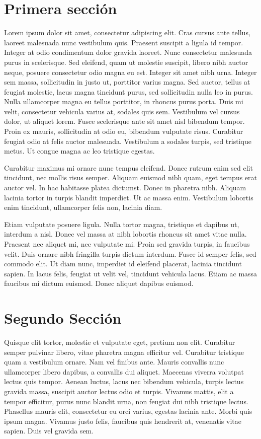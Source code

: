 \documentclass[a4paper,twoside=false,12pt,spanish,DIV=7]{scrbook}
\begin{document}
\section{Primera sección}
Lorem ipsum dolor sit amet, consectetur adipiscing elit. Cras cursus ante tellus, laoreet malesuada nunc vestibulum quis. Praesent suscipit a ligula id tempor. Integer at odio condimentum dolor gravida laoreet. Nunc consectetur malesuada purus in scelerisque. Sed eleifend, quam ut molestie suscipit, libero nibh auctor neque, posuere consectetur odio magna eu est. Integer sit amet nibh urna. Integer sem massa, sollicitudin in justo ut, porttitor varius magna. Sed auctor, tellus at feugiat molestie, lacus magna tincidunt purus, sed sollicitudin nulla leo in purus. Nulla ullamcorper magna eu tellus porttitor, in rhoncus purus porta. Duis mi velit, consectetur vehicula varius at, sodales quis sem. Vestibulum vel cursus dolor, ut aliquet lorem. Fusce scelerisque ante sit amet nisl bibendum tempor. Proin ex mauris, sollicitudin at odio eu, bibendum vulputate risus. Curabitur feugiat odio at felis auctor malesuada. Vestibulum a sodales turpis, sed tristique metus. Ut congue magna ac leo tristique egestas.

Curabitur maximus mi ornare nunc tempus eleifend. Donec rutrum enim sed elit tincidunt, nec mollis risus semper. Aliquam euismod nibh quam, eget tempus erat auctor vel. In hac habitasse platea dictumst. Donec in pharetra nibh. Aliquam lacinia tortor in turpis blandit imperdiet. Ut ac massa enim. Vestibulum lobortis enim tincidunt, ullamcorper felis non, lacinia diam.

Etiam vulputate posuere ligula. Nulla tortor magna, tristique et dapibus ut, interdum a nisl. Donec vel massa at nibh lobortis rhoncus sit amet vitae nulla. Praesent nec aliquet mi, nec vulputate mi. Proin sed gravida turpis, in faucibus velit. Duis ornare nibh fringilla turpis dictum interdum. Fusce id semper felis, sed commodo elit. Ut diam nunc, imperdiet id eleifend placerat, lacinia tincidunt sapien. In lacus felis, feugiat ut velit vel, tincidunt vehicula lacus. Etiam ac massa faucibus mi dictum euismod. Donec aliquet dapibus euismod.

\section{Segundo Sección}
Quisque elit tortor, molestie et vulputate eget, pretium non elit. Curabitur semper pulvinar libero, vitae pharetra magna efficitur vel. Curabitur tristique quam a vestibulum ornare. Nam vel finibus ante. Mauris convallis nunc ullamcorper libero dapibus, a convallis dui aliquet. Maecenas viverra volutpat lectus quis tempor. Aenean luctus, lacus nec bibendum vehicula, turpis lectus gravida massa, suscipit auctor lectus odio et turpis. Vivamus mattis, elit a tempor efficitur, purus nunc blandit urna, non feugiat dui nibh tristique lectus. Phasellus mauris elit, consectetur eu orci varius, egestas lacinia ante. Morbi quis ipsum magna. Vivamus justo felis, faucibus quis hendrerit at, venenatis vitae sapien. Duis vel gravida sem.
\end{document}
